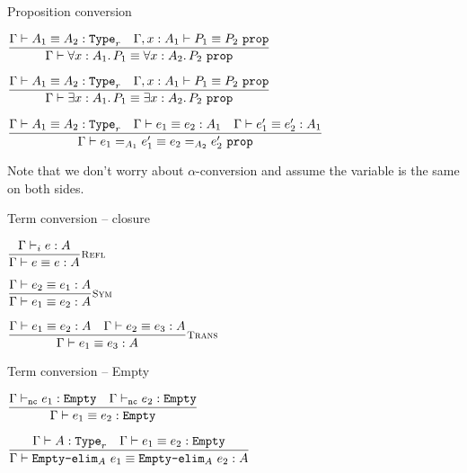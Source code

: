 \begin{frame}{Proposition conversion}

\begin{center}
  $\infrule{\typeconv{A_1}{A_2}[r] \quad \propconv[\extend{\Gamma}{x}{A_1}]{P_1}{P_2}}{\propconv{\All{x}[A_1]{P_1}}{\All{x}[A_2]{P_2}}}$

  \vspace{2em}

  $\infrule{\typeconv{A_1}{A_2}[r] \quad \propconv[\extend{\Gamma}{x}{A_1}]{P_1}{P_2}}{\propconv{\Ex{x}[A_1]{P_1}}{\Ex{x}[A_2]{P_2}}}$

  \vspace{2em}

  $\infrule{\typeconv{A_1}{A_2}[r] \quad \termconv{e_1}{e_2}{A_1} \quad \termconv{e_1'}{e_2'}{A_1}}{\propconv{\Eq[A_1]{e_1}{e_1'}}{\Eq[A_2]{e_2}{e_2'}}}$
\end{center}

\vspace{2em}

Note that we don't worry about $\alpha$-conversion and assume the variable is the same on both sides.

\end{frame}

\begin{frame}{Term conversion -- closure}

\begin{center}
  $\infrule[Refl]{\typing{e}{A}}{\termconv{e}{e}{A}}$

  \vspace{2em}

  $\infrule[Sym]{\termconv{e_2}{e_1}{A}}{\termconv{e_1}{e_2}{A}}$

  \vspace{2em}

  $\infrule[Trans]{\termconv{e_1}{e_2}{A} \quad \termconv{e_2}{e_3}{A}}{\termconv{e_1}{e_3}{A}}$
\end{center}

\end{frame}

\begin{frame}{Term conversion -- Empty}

\begin{center}
  $\infrule{\typing[\Gamma][\noncomputable]{e_1}{\Empty} \quad \typing[\Gamma][\noncomputable]{e_2}{\Empty}}{\termconv[\Gamma]{e_1}{e_2}{\Empty}}$

  \vspace{2em}

  $\infrule{\type[\Gamma]{A}[r] \quad \termconv{e_1}{e_2}{\Empty}}{\termconv{\emptyelim{e_1}[A]}{\emptyelim{e_2}[A]}{A}}$
\end{center}

\end{frame}


